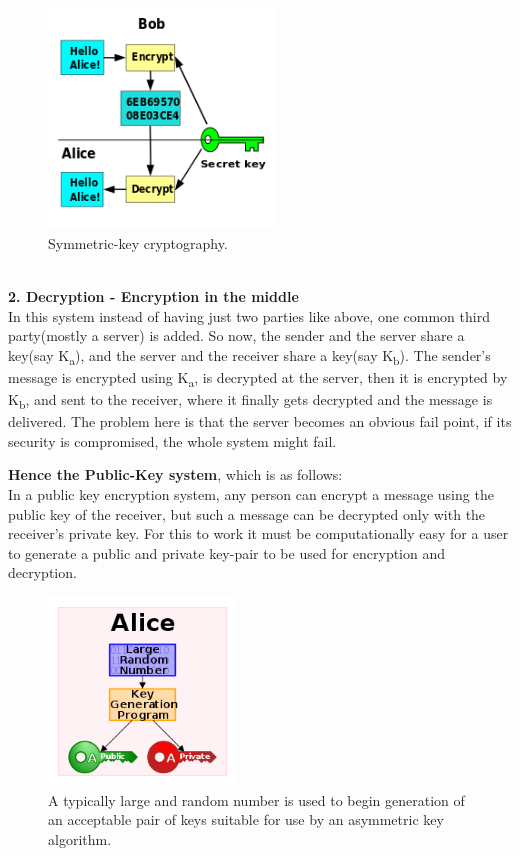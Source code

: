 \documentclass[12 pt]{article}
\begin{document}
\begin{figure}[h!]
  \includegraphics[width=60mm]{Symmetric_key_encryption.png}
  \centering
  \caption{Symmetric-key cryptography.}
  \label{fig:Symmetric-key cryptography}
\end{figure}
\noindent
\\\textbf{2. Decryption - Encryption in the middle}
\\In this system instead of having just two parties like above, one common third party(mostly a server) is added. So now, the sender and the server share a key(say K\textsubscript{a}), and the server and the receiver share a key(say K\textsubscript{b}). The sender's message is encrypted using K\textsubscript{a}, is decrypted at the server, then it is encrypted by K\textsubscript{b}, and sent to the receiver, where it finally gets decrypted and the message is delivered. The problem here is that the server becomes an obvious fail point, if its security is compromised, the whole system might fail.

\textbf{Hence the Public-Key system}, which is as follows:
\\In a public key encryption system, any person can encrypt a message using the public key of the receiver, but such a message can be decrypted only with the receiver's private key. For this to work it must be computationally easy for a user to generate a public and private key-pair to be used for encryption and decryption.

\begin{figure}[h!]
  \includegraphics[width=50mm]{250px-Public-key-crypto-1.png}
  \centering
  \caption{A typically large and random number is used to begin generation of an acceptable pair of keys suitable for use by an asymmetric key algorithm.}
  \label{fig:PublicKey-NumGen}
\end{figure}
\end{document}
